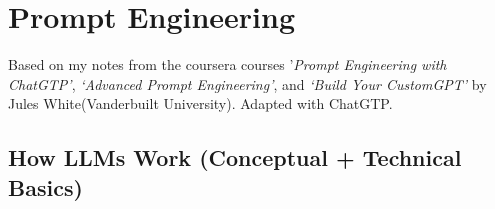 \documentclass[
  letterpaper,
  DIV=11,
  numbers=noendperiod]{scrreprt}
\begin{document}

\chapter{Prompt Engineering}\label{prompt-engineering}

Based on my notes from the coursera courses '\emph{Prompt Engineering
with ChatGTP'}, \emph{`Advanced Prompt Engineering'}, and \emph{`Build
Your CustomGPT'} by Jules White(Vanderbuilt University). Adapted with
ChatGTP.

\section{How LLMs Work (Conceptual + Technical
Basics)}\label{how-llms-work-conceptual-technical-basics}
\end{document}
